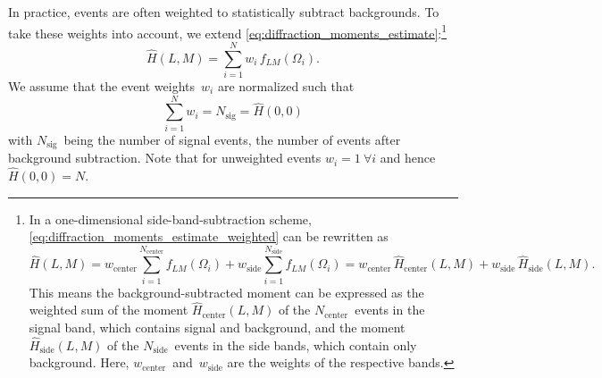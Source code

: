 In practice, events are often weighted to statistically subtract
backgrounds.  To take these weights into account, we extend
\cref{eq:diffraction_moments_estimate}:\footnote{In a one-dimensional
side-band-subtraction scheme,
\cref{eq:diffraction_moments_estimate_weighted} can be rewritten as
\begin{equation}
  \hat{H}(L, M)
  = w_\text{center} \sum_{i = 1}^{N_\text{center}} f_{L M}(\Omega_i)
  + w_\text{side}   \sum_{i = 1}^{N_\text{side}}   f_{L M}(\Omega_i)
  = w_\text{center}\, \hat{H}_\text{center}(L, M)
  + w_\text{side}\,   \hat{H}_\text{side}(L, M).
\end{equation}
This means the background-subtracted moment can be expressed as the
weighted sum of the moment $\hat{H}_\text{center}(L, M)$ of the
$N_\text{center}$~events in the signal band, which contains signal and
background, and the moment $\hat{H}_\text{side}(L, M)$ of the
$N_\text{side}$~events in the side bands, which contain only
background.  Here, $w_\text{center}$~and~$w_\text{side}$ are the
weights of the respective bands.}
\begin{equation}
  \label{eq:diffraction_moments_estimate_weighted}
  \hat{H}(L, M)
  = \sum_{i = 1}^N w_i\, f_{L M}(\Omega_i).
\end{equation}
We assume that the event weights~$w_i$ are normalized such that
\begin{equation}
  \label{eq:event_weights_norm}
  \sum_{i = 1}^N w_i
  = N_\text{sig}
  = \hat{H}(0, 0)
\end{equation}
with $N_\text{sig}$~being the number of signal events, \ie the number
of events after background subtraction.  Note that for unweighted
events $w_i = 1~ \forall i$ and hence $\hat{H}(0, 0) = N$.


